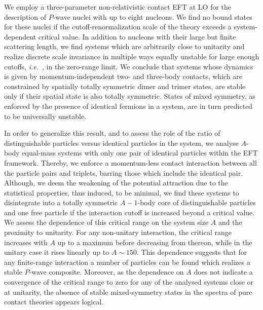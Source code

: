 \documentclass[preprint,12pt]{elsarticle}
\newcommand{\ie}{\textit{i.e.}~}
\begin{document}
We employ a three-parameter non-relativistic contact EFT at LO for the description of $P$-wave nuclei with up to eight nucleons.
We find no bound states for these nuclei if the cutoff-renormalization scale of the theory exceeds a system-dependent critical value.
In addition to nucleons with their large but finite scattering length, we find systems which are arbitrarily close to unitarity and realize
discrete scale invariance in multiple ways equally unstable for large enough cutoffs, \ie, in the zero-range limit.
We conclude that systems whose dynamics is given by momentum-independent two- and three-body contacts, which are
constrained by spatially totally symmetric dimer and trimer states, are stable only if their spatial state is also totally symmetric.
States of mixed symmetry, as enforced by the presence of identical fermions in a system, are in turn predicted to be universally unstable. 

In order to generalize this result, and to assess the role of the ratio of distinguishable particles versus identical
particles in the system, we analyse $A$-body equal-mass systems with only one pair of identical particles within the EFT framework.
Thereby, we enforce a momentum-less contact interaction between all the particle pairs and triplets, barring those which include the
identical pair. 
Although, we deem the weakening of the potential attraction due to the statistical properties, thus induced, to be minimal,
we find these systems to disintegrate into a totally symmetric $A-1$-body core of distinguishable particles and one free particle
if the interaction cutoff is increased beyond a critical value.
We assess the dependence of this critical range on the system size $A$ and the proximity to unitarity.
For any non-unitary interaction, the critical range increases with $A$ up to a maximum before decreasing from thereon, while in the unitary
case it rises linearly up to $A\sim150$.
This dependence suggests that for any finite-range interaction a number of particles can be found which realizes a stable $P$-wave composite.
Moreover, as the dependence on $A$ does not indicate a convergence of the critical range to zero for any of the analysed systems close or at
unitarity, the absence of stable  mixed-symmetry states in the spectra of pure contact theories appears logical.
\end{document}
